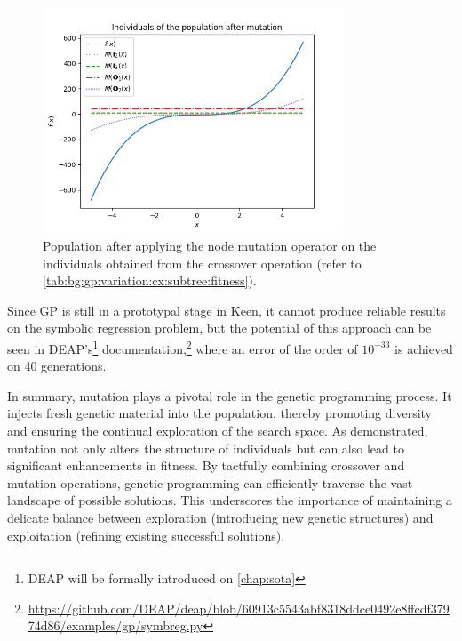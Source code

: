   \begin{figure}[ht!]
    \centering
    \includegraphics[width=0.8\textwidth]
      {img/theoretical_framework/gp_pop_mutated.png}
    \caption{
        Population after applying the node mutation operator on the individuals obtained from the crossover operation 
        (refer to \vref{tab:bg:gp:variation:cx:subtree:fitness}).
    }
    \label{fig:bg:gp:var:mut:pop}
  \end{figure}

  Since GP is still in a prototypal stage in Keen, it cannot produce reliable results on the symbolic regression problem, but
  the potential of this approach can be seen in DEAP's\footnote{DEAP will be formally introduced on \vref{chap:sota}} 
  documentation,\footnote{\url{https://github.com/DEAP/deap/blob/60913c5543abf8318ddce0492e8ffcdf37974d86/examples/gp/symbreg.py}}
  where an error of the order of \(10^{-33}\) is achieved on 40 generations.

  In summary, mutation plays a pivotal role in the genetic programming process.
  It injects fresh genetic material into the population, thereby promoting 
  diversity and ensuring the continual exploration of the search space.
  As demonstrated, mutation not only alters the structure of individuals but can 
  also lead to significant enhancements in fitness.
  By tactfully combining crossover and mutation operations, genetic programming 
  can efficiently traverse the vast landscape of possible solutions.
  This underscores the importance of maintaining a delicate balance between 
  exploration (introducing new genetic structures) and exploitation (refining 
  existing successful solutions).
